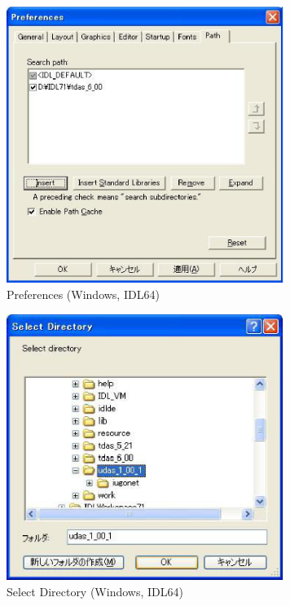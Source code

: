 \documentclass[a4j]{jbook}
\begin{document}
\begin{figure}[H]
\begin{center}
\includegraphics[width=9cm]{images/fig_idl64/Fig3.eps}
\caption{Preferences (Windows, IDL64)}
\label{idl64/Fig3.eps}
\end{center}
\end{figure}

\begin{figure}[H]
\begin{center}
\includegraphics[width=9cm]{images/fig_idl71/Fig8.eps}
\caption{Select Directory (Windows, IDL64)}
\label{idl7164/Fig8.eps}
\end{center}
\end{figure}

\end{document}
